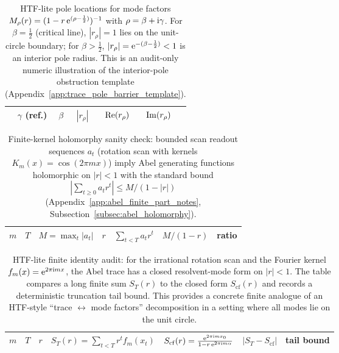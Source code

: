 \begin{table}[H]
\centering
\scriptsize
\setlength{\tabcolsep}{6pt}
\renewcommand{\arraystretch}{1.15}
\begin{tabular}{r r r r r r}
\toprule
$\gamma$ (ref.) & $\beta$ & $|r_\rho|$ & $\operatorname{Re}(r_\rho)$ & $\operatorname{Im}(r_\rho)$ \\
\midrule
%
\end{tabular}
\caption{HTF-lite pole locations for mode factors $M_\rho(r)=(1-r\,\mathrm{e}^{(\rho-\frac12)})^{-1}$ with $\rho=\beta+\mathrm{i}\gamma$.
For $\beta=\tfrac12$ (critical line), $|r_\rho|=1$ lies on the unit-circle boundary; for $\beta>\tfrac12$, $|r_\rho|=\mathrm{e}^{-(\beta-\frac12)}<1$ is an interior pole radius.
This is an audit-only numeric illustration of the interior-pole obstruction template (Appendix~\ref{app:trace_pole_barrier_template}).}
\label{tab:htf_lite_zero_mode_pole_audit}
\end{table}

\begin{table}[H]
\centering
\scriptsize
\setlength{\tabcolsep}{6pt}
\renewcommand{\arraystretch}{1.15}
\begin{tabular}{r r r r r r r}
\toprule
$m$ & $T$ & $M=\max_t|a_t|$ & $r$ & $\sum_{t<T} a_t r^t$ & $M/(1-r)$ & ratio \\
\midrule
%
\end{tabular}
\caption{Finite-kernel holomorphy sanity check: bounded scan readout sequences $a_t$ (rotation scan with kernels $K_m(x)=\cos(2\pi m x)$) imply Abel generating functions holomorphic on $|r|<1$
with the standard bound $|\sum_{t\ge 0} a_t r^t|\le M/(1-|r|)$ (Appendix~\ref{app:abel_finite_part_notes}, Subsection~\ref{subsec:abel_holomorphy}).}
\label{tab:htf_lite_kernel_holomorphy_audit}
\end{table}



\begin{table}[H]
\centering
\scriptsize
\setlength{\tabcolsep}{6pt}
\renewcommand{\arraystretch}{1.15}
\begin{tabular}{r r r p{} p{} r r}
\toprule
$m$ & $T$ & $r$ & $S_T(r)=\sum_{t<T} r^t f_m(x_t)$ & $S_{\mathrm{cf}}(r)=\frac{\mathrm{e}^{2\pi\mathrm{i} m x_0}}{1-r\,\mathrm{e}^{2\pi\mathrm{i} m\alpha}}$ & $|S_T-S_{\mathrm{cf}}|$ & tail bound \\
\midrule
%
\end{tabular}
\caption{HTF-lite finite identity audit: for the irrational rotation scan and the Fourier kernel $f_m(x)=\mathrm{e}^{2\pi\mathrm{i} m x}$, the Abel trace has a closed resolvent-mode form on $|r|<1$.
The table compares a long finite sum $S_T(r)$ to the closed form $S_{\mathrm{cf}}(r)$ and records a deterministic truncation tail bound.
This provides a concrete finite analogue of an HTF-style ``trace $\leftrightarrow$ mode factors'' decomposition in a setting where all modes lie on the unit circle.}
\label{tab:htf_lite_resolvent_identity_audit}
\end{table}

